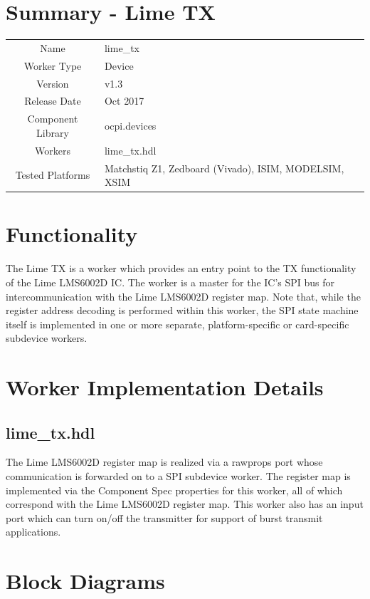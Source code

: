 \documentclass{article}
\author{} %
\date{Version \docVersion} %
\title{\docTitle}
\def\docVersion{1.3}
\def\comp{lime\_tx}
\def\Comp{Lime TX}
\begin{document}
\section*{Summary - \Comp}
\begin{tabular}{|c|M{13.5cm}|}
  \hline
                    &                  \\
  \hline
  Name              & \comp            \\
  \hline
  Worker Type       & Device           \\
  \hline
  Version           & v\docVersion{}   \\
  \hline
  Release Date      & Oct 2017         \\
  \hline
  Component Library & ocpi.devices     \\
  \hline
  Workers           & \comp.hdl        \\
  \hline
  Tested Platforms  & Matchstiq Z1, Zedboard (Vivado), ISIM, MODELSIM, XSIM \\
  \hline
\end{tabular}

\section*{Functionality}
  The \Comp{} is a worker which provides an entry point to the TX functionality of the Lime LMS6002D IC. The worker is a master for the IC's SPI bus for intercommunication with the Lime LMS6002D register map. Note that, while the register address decoding is performed within this worker, the SPI state machine itself is implemented in one or more separate, platform-specific or card-specific subdevice workers.

\section*{Worker Implementation Details}
\subsection*{\comp.hdl}
The Lime LMS6002D register map is realized via a rawprops port whose communication is forwarded on to a SPI subdevice worker. The register map is implemented via the Component Spec properties for this worker, all of which correspond with the Lime LMS6002D register map. This worker also has an input port which can turn on/off the transmitter for support of burst transmit applications.

\section*{Block Diagrams}
\end{document}
